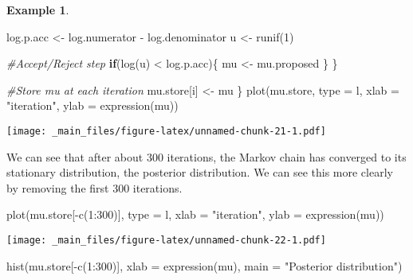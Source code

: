 \documentclass[
]{book}
\newenvironment{Shaded}{\begin{snugshade}}{\end{snugshade}}
\newcommand{\AttributeTok}[1]{\textcolor[rgb]{0.77,0.63,0.00}{#1}}
\newcommand{\CommentTok}[1]{\textcolor[rgb]{0.56,0.35,0.01}{\textit{#1}}}
\newcommand{\ControlFlowTok}[1]{\textcolor[rgb]{0.13,0.29,0.53}{\textbf{#1}}}
\newcommand{\DecValTok}[1]{\textcolor[rgb]{0.00,0.00,0.81}{#1}}
\newcommand{\FunctionTok}[1]{\textcolor[rgb]{0.00,0.00,0.00}{#1}}
\newcommand{\NormalTok}[1]{#1}
\newcommand{\OtherTok}[1]{\textcolor[rgb]{0.56,0.35,0.01}{#1}}
\newcommand{\SpecialCharTok}[1]{\textcolor[rgb]{0.00,0.00,0.00}{#1}}
\newcommand{\StringTok}[1]{\textcolor[rgb]{0.31,0.60,0.02}{#1}}
\theoremstyle{definition}
\theoremstyle{definition}
\newtheorem{example}{Example}[chapter]
\theoremstyle{definition}
\theoremstyle{definition}
\theoremstyle{remark}
\begin{document}
\begin{example}
\begin{Shaded}
\begin{Highlighting}[]
\NormalTok{    log.p.acc }\OtherTok{\textless{}{-}}\NormalTok{ log.numerator }\SpecialCharTok{{-}}\NormalTok{ log.denominator}
\NormalTok{    u }\OtherTok{\textless{}{-}} \FunctionTok{runif}\NormalTok{(}\DecValTok{1}\NormalTok{)}
    
    \CommentTok{\#Accept/Reject step}
    \ControlFlowTok{if}\NormalTok{(}\FunctionTok{log}\NormalTok{(u) }\SpecialCharTok{\textless{}}\NormalTok{ log.p.acc)\{}
\NormalTok{      mu }\OtherTok{\textless{}{-}}\NormalTok{ mu.proposed}
\NormalTok{    \}}
\NormalTok{  \}}
  
  \CommentTok{\#Store mu at each iteration}
\NormalTok{  mu.store[i] }\OtherTok{\textless{}{-}}\NormalTok{ mu}
\NormalTok{\}}
\FunctionTok{plot}\NormalTok{(mu.store, }\AttributeTok{type =} \StringTok{\textquotesingle{}l\textquotesingle{}}\NormalTok{, }\AttributeTok{xlab =} \StringTok{"iteration"}\NormalTok{, }\AttributeTok{ylab =} \FunctionTok{expression}\NormalTok{(mu))}
\end{Highlighting}
\end{Shaded}

\texttt{[image: \_main\_files/figure-latex/unnamed-chunk-21-1.pdf]}

We can see that after about 300 iterations, the Markov chain has converged to its stationary distribution, the posterior distribution. We can see this more clearly by removing the first 300 iterations.

\begin{Shaded}
\begin{Highlighting}[]
\FunctionTok{plot}\NormalTok{(mu.store[}\SpecialCharTok{{-}}\FunctionTok{c}\NormalTok{(}\DecValTok{1}\SpecialCharTok{:}\DecValTok{300}\NormalTok{)], }\AttributeTok{type =} \StringTok{\textquotesingle{}l\textquotesingle{}}\NormalTok{, }\AttributeTok{xlab =} \StringTok{"iteration"}\NormalTok{, }\AttributeTok{ylab =} \FunctionTok{expression}\NormalTok{(mu))}
\end{Highlighting}
\end{Shaded}

\texttt{[image: \_main\_files/figure-latex/unnamed-chunk-22-1.pdf]}

\begin{Shaded}
\begin{Highlighting}[]
\FunctionTok{hist}\NormalTok{(mu.store[}\SpecialCharTok{{-}}\FunctionTok{c}\NormalTok{(}\DecValTok{1}\SpecialCharTok{:}\DecValTok{300}\NormalTok{)], }\AttributeTok{xlab =} \FunctionTok{expression}\NormalTok{(mu), }\AttributeTok{main =} \StringTok{"Posterior distribution"}\NormalTok{)}
\end{Highlighting}
\end{Shaded}


\end{example}
\end{document}
